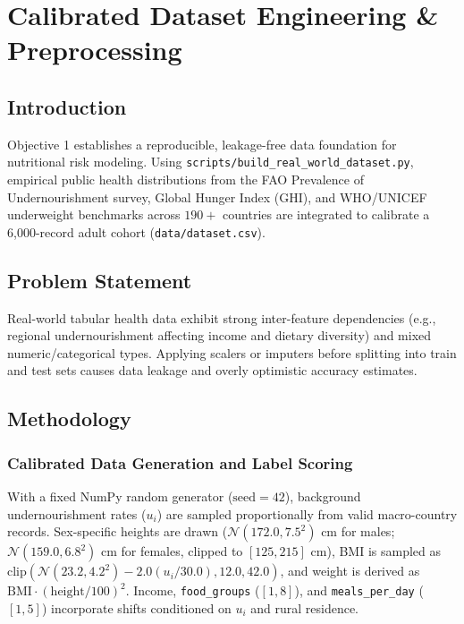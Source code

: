 \documentclass[12pt,a4paper]{report}
\begin{document}
\chapter{Calibrated Dataset Engineering \& Preprocessing}

\section{Introduction}
Objective 1 establishes a reproducible, leakage-free data foundation for nutritional risk modeling. Using \texttt{scripts/build\_real\_world\_dataset.py}, empirical public health distributions from the FAO Prevalence of Undernourishment survey, Global Hunger Index (GHI), and WHO/UNICEF underweight benchmarks across $190+$ countries are integrated to calibrate a 6,000-record adult cohort (\texttt{data/dataset.csv}).

\section{Problem Statement}
Real-world tabular health data exhibit strong inter-feature dependencies (e.g., regional undernourishment affecting income and dietary diversity) and mixed numeric/categorical types. Applying scalers or imputers before splitting into train and test sets causes data leakage and overly optimistic accuracy estimates.

\section{Methodology}
\subsection{Calibrated Data Generation and Label Scoring}
With a fixed NumPy random generator ($\text{seed} = 42$), background undernourishment rates ($u_i$) are sampled proportionally from valid macro-country records. Sex-specific heights are drawn ($\mathcal{N}(172.0, 7.5^2)$ cm for males; $\mathcal{N}(159.0, 6.8^2)$ cm for females, clipped to $[125, 215]$ cm), BMI is sampled as $\text{clip}(\mathcal{N}(23.2, 4.2^2) - 2.0(u_i/30.0), 12.0, 42.0)$, and weight is derived as $\text{BMI} \cdot (\text{height}/100)^2$. Income, \texttt{food\_groups} ($[1, 8]$), and \texttt{meals\_per\_day} ($[1, 5]$) incorporate shifts conditioned on $u_i$ and rural residence.
\end{document}
